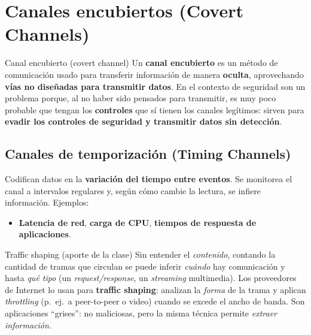 \documentclass[11pt,a4paper]{article}
\begin{document}
\section{Canales encubiertos (Covert Channels)}

\begin{defbox}{Canal encubierto (covert channel)}
Un \textbf{canal encubierto} es un método de comunicación usado para transferir información de
manera \textbf{oculta}, aprovechando \textbf{vías no diseñadas para transmitir datos}. En el
contexto de seguridad son un problema porque, al no haber sido pensados para transmitir, es muy
poco probable que tengan los \textbf{controles} que sí tienen los canales legítimos: sirven para
\textbf{evadir los controles de seguridad y transmitir datos sin detección}.
\end{defbox}

\subsection{Canales de temporización (Timing Channels)}
Codifican datos en la \textbf{variación del tiempo entre eventos}. Se monitorea el canal a
intervalos regulares y, según cómo cambie la lectura, se infiere información. Ejemplos:
\begin{itemize}[leftmargin=1.4em,itemsep=1pt]
  \item \textbf{Latencia de red}, \textbf{carga de CPU}, \textbf{tiempos de respuesta de
        aplicaciones}.
\end{itemize}

\begin{practbox}{Traffic shaping (aporte de la clase)}
Sin entender el \emph{contenido}, contando la cantidad de tramas que circulan se puede inferir
\emph{cuándo} hay comunicación y hasta \emph{qué tipo} (un \emph{request/response}, un
\emph{streaming} multimedia). Los proveedores de Internet lo usan para \textbf{traffic
shaping}: analizan la \emph{forma} de la trama y aplican \emph{throttling} (p.\ ej.\ a peer-to-peer
o video) cuando se excede el ancho de banda. Son aplicaciones ``grises'': no maliciosas, pero la
misma técnica permite \emph{extraer información}.
\end{practbox}
\end{document}
